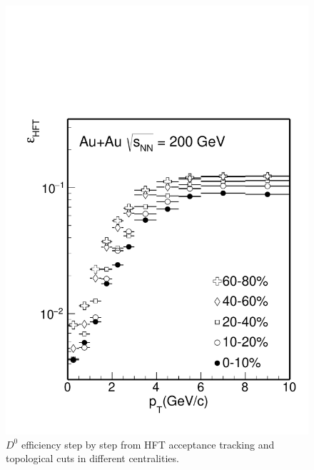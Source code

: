 \begin{figure}[htbp]
\begin{minipage}[htbp]{0.52\linewidth}
\centering
\includegraphics[width=1.0\textwidth,angle=0]{figure/Run14_D0HFT/Datad0Eff_hftTopo_10.pdf}
\caption{ $D^0$ efficiency step by step from HFT acceptance tracking and topological cuts in different centralities. \label{D0effStep3}}
\end{minipage}
\hfill
\begin{minipage}[htbp]{0.52\linewidth}
\centering

\end{minipage}
\end{figure}
